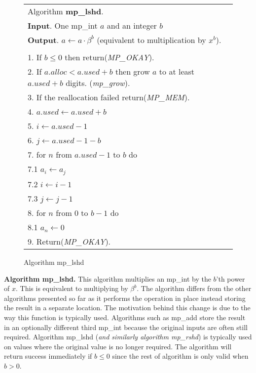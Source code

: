 \documentclass[b5paper]{book}
\begin{document}
\newpage\begin{figure}[!here]
\begin{small}
\begin{center}
\begin{tabular}{l}
\hline Algorithm \textbf{mp\_lshd}. \\
\textbf{Input}.   One mp\_int $a$ and an integer $b$ \\
\textbf{Output}.  $a \leftarrow a \cdot \beta^b$ (equivalent to multiplication by $x^b$). \\
\hline \\
1.  If $b \le 0$ then return(\textit{MP\_OKAY}). \\
2.  If $a.alloc < a.used + b$ then grow $a$ to at least $a.used + b$ digits.  (\textit{mp\_grow}). \\
3.  If the reallocation failed return(\textit{MP\_MEM}). \\
4.  $a.used \leftarrow a.used + b$ \\
5.  $i \leftarrow a.used - 1$ \\
6.  $j \leftarrow a.used - 1 - b$ \\
7.  for $n$ from $a.used - 1$ to $b$ do \\
\hspace{3mm}7.1  $a_{i} \leftarrow a_{j}$ \\
\hspace{3mm}7.2  $i \leftarrow i - 1$ \\
\hspace{3mm}7.3  $j \leftarrow j - 1$ \\
8.  for $n$ from 0 to $b - 1$ do \\
\hspace{3mm}8.1  $a_n \leftarrow 0$ \\
9.  Return(\textit{MP\_OKAY}). \\
\hline
\end{tabular}
\end{center}
\end{small}
\caption{Algorithm mp\_lshd}
\end{figure}

\textbf{Algorithm mp\_lshd.}
This algorithm multiplies an mp\_int by the $b$'th power of $x$.  This is equivalent to multiplying by $\beta^b$.  The algorithm differs 
from the other algorithms presented so far as it performs the operation in place instead storing the result in a separate location.  The
motivation behind this change is due to the way this function is typically used.  Algorithms such as mp\_add store the result in an optionally
different third mp\_int because the original inputs are often still required.  Algorithm mp\_lshd (\textit{and similarly algorithm mp\_rshd}) is
typically used on values where the original value is no longer required.  The algorithm will return success immediately if 
$b \le 0$ since the rest of algorithm is only valid when $b > 0$.  
\end{document}
